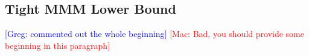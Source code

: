 \documentclass[sigplan,review,anonymous]{acmart}\settopmatter{printfolios=true,printccs=false,printacmref=false}
\newcommand\greg[1]{\textcolor{blue}{[Greg: #1]}}
\newcommand\mac[1]{\textcolor{red}{[Mac: #1]}}
\begin{document}
%
%


\subsection{Tight MMM Lower Bound}
\label{sec:seqScheduling}

\greg{commented out the whole beginning}
\mac{Bad, you should provide some beginning in this paragraph}
\end{document}
